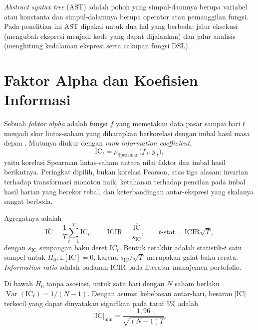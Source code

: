 \documentclass{laporanta1statugm}
\begin{document}
\textit{Abstract syntax tree} (AST) adalah pohon yang simpul-daunnya berupa
variabel atau konstanta dan simpul-dalamnya berupa operator atau pemanggilan
fungsi. Pada penelitian ini AST dipakai untuk dua hal yang berbeda: jalur
eksekusi (mengubah ekspresi menjadi kode yang dapat dijalankan) dan jalur
analisis (menghitung kedalaman ekspresi serta cakupan fungsi DSL).

\section{Faktor Alpha dan Koefisien Informasi}

Sebuah \emph{faktor alpha} adalah fungsi $f$ yang memetakan data pasar sampai
hari $t$ menjadi skor lintas-saham yang diharapkan berkorelasi dengan imbal
hasil masa depan \citep{kakushadze, alphagen}. Mutunya diukur dengan
\textit{rank information coefficient},
\begin{equation}
  \mathrm{IC}_t = \rho_{\text{Spearman}}\bigl(f_{\cdot t}, y_{\cdot t}\bigr),
  \label{eq:ic}
\end{equation}
yaitu korelasi Spearman \citep{spearman} lintas-saham antara nilai faktor dan
imbal hasil berikutnya. Peringkat dipilih, bukan korelasi Pearson, atas tiga
alasan: invarian terhadap transformasi monoton naik, ketahanan terhadap pencilan
pada imbal hasil harian yang berekor tebal, dan keterbandingan antar-ekspresi
yang skalanya sangat berbeda.

Agregatnya adalah
\begin{equation}
  \overline{\mathrm{IC}} = \frac{1}{T}\sum_{t=1}^{T}\mathrm{IC}_t, \qquad
  \mathrm{ICIR} = \frac{\overline{\mathrm{IC}}}{s_{\mathrm{IC}}}, \qquad
  t\text{-stat} = \mathrm{ICIR}\sqrt{T},
  \label{eq:icir}
\end{equation}
dengan $s_{\mathrm{IC}}$ simpangan baku deret $\mathrm{IC}_t$. Bentuk terakhir
adalah statistik-$t$ satu sampel untuk $H_0:\mathbb{E}[\mathrm{IC}]=0$, karena
$s_{\mathrm{IC}}/\sqrt{T}$ merupakan galat baku rerata. \textit{Information
ratio} \citep{grinold} adalah padanan $\mathrm{ICIR}$ pada literatur
manajemen portofolio.

\begin{teorema}
\label{teo:ambang}
Di bawah $H_0$ tanpa asosiasi, untuk satu hari dengan $N$ saham berlaku
$\operatorname{Var}(\mathrm{IC}_t) = 1/(N-1)$. Dengan asumsi kebebasan
antar-hari, besaran $\lvert\overline{\mathrm{IC}}\rvert$ terkecil yang dapat
dinyatakan signifikan pada taraf $5\%$ adalah
\begin{equation}
  \lvert\overline{\mathrm{IC}}\rvert_{\min} = \frac{1{,}96}{\sqrt{(N-1)T}} .
  \label{eq:ambang}
\end{equation}
\end{teorema}
\end{document}
